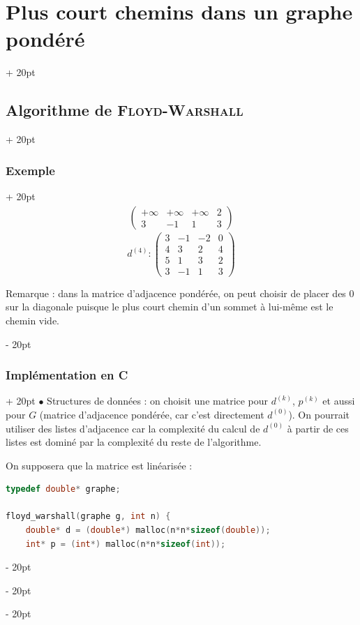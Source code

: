 \documentclass[a4paper, 12pt, twoside]{article}
\newcommand{\ind}[1][20pt]{\advance\leftskip + #1}
\newcommand{\deind}[1][20pt]{\advance\leftskip - #1}
\newenvironment{indt}[2][20pt]{#2 \par \ind[#1]}{\par \deind} %
\begin{document}
\begin{indt}{\section{Plus court chemins dans un graphe pondéré}}
\begin{indt}{\subsection{Algorithme de \textsc{Floyd-Warshall}}}
\begin{indt}{\subsubsection{Exemple}}
\[\begin{array}{cc}
\begin{pmatrix}
                            +\infty & +\infty & +\infty & 2
                            \\
                            3 & -1 & 1 & \boxed 3
                        \end{pmatrix}
                    \end{array}
                \]
                \[
                    d^{(4)} :
                    \begin{pmatrix}
                        \boxed 3 & \boxed{-1} & -2 & 0
                        \\
                        4 & \boxed 3 & 2 & 4
                        \\
                        \boxed 5 & \boxed 1 & \boxed 3 & 2
                        \\
                        3 & -1 & 1 & 3
                    \end{pmatrix}
                \]

                Remarque : dans la matrice d'adjacence pondérée, on peut choisir de placer des $0$ sur la diagonale puisque le plus court chemin d'un sommet à lui-même est le chemin vide.
            \end{indt}

            \vspace{12pt}
            
            \begin{indt}{\subsubsection{Implémentation en C}}
                $\bullet$ Structures de données : on choisit une matrice pour $d^{(k)}$, $p^{(k)}$ et aussi pour $G$ (matrice d'adjacence pondérée, car c'est directement $d^{(0)}$).
                On pourrait utiliser des listes d'adjacence car la complexité du calcul de $d^{(0)}$ à partir de ces listes est dominé par la complexité du reste de l'algorithme.

                \vspace{6pt}
                
                On supposera que la matrice est linéarisée :
                \begin{lstlisting}[language=C, xleftmargin=80pt]
typedef double* graphe;

floyd_warshall(graphe g, int n) {
    double* d = (double*) malloc(n*n*sizeof(double));
    int* p = (int*) malloc(n*n*sizeof(int));


\end{lstlisting}
\end{indt}
\end{indt}
\end{indt}
\end{document}
